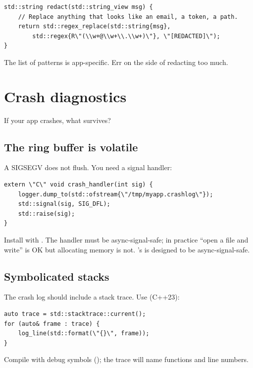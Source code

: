 \begin{lstlisting}
std::string redact(std::string_view msg) {
    // Replace anything that looks like an email, a token, a path.
    return std::regex_replace(std::string{msg},
        std::regex{R\"(\\w+@\\w+\\.\\w+)\"}, \"[REDACTED]\");
}
\end{lstlisting}

The list of patterns is app-specific. Err on the side of
redacting too much.

\section{Crash diagnostics}

If your app crashes, what survives?

\subsection*{The ring buffer is volatile}

A SIGSEGV does not flush. You need a signal handler:

\begin{lstlisting}
extern \"C\" void crash_handler(int sig) {
    logger.dump_to(std::ofstream{\"/tmp/myapp.crashlog\"});
    std::signal(sig, SIG_DFL);
    std::raise(sig);
}
\end{lstlisting}

Install with . The
handler must be async-signal-safe; in practice ``open a file
and write'' is OK but allocating memory is not. \maya{}'s
 is designed to be async-signal-safe.

\subsection*{Symbolicated stacks}

The crash log should include a stack trace. Use
 (C++23):

\begin{lstlisting}
auto trace = std::stacktrace::current();
for (auto& frame : trace) {
    log_line(std::format(\"{}\", frame));
}
\end{lstlisting}

Compile with debug symbols (); the trace will name
functions and line numbers.

